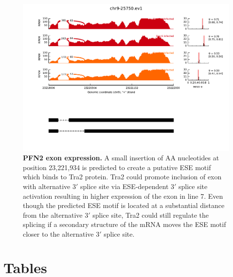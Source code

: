 \documentclass[10pt]{article}
\begin{document}
\begin{figure}[!ht]
    \begin{center}
        \includegraphics[width=6in]{pfn2_miso.pdf}
    \end{center}
    \caption{
        {\bf PFN2 exon expression.}
        A small insertion of AA nucleotides at position 23,221,934 is predicted to create a putative ESE motif
        which binds to Tra2 protein.
        Tra2 could promote inclusion of exon with alternative 3$\prime$ splice site via ESE-dependent
        3$\prime$ splice site activation resulting in higher expression of the exon in line 7.
        Even though the predicted ESE motif is located at a substantial distance from the alternative 3$\prime$ splice site,
        Tra2 could still regulate the splicing if a secondary structure of the mRNA moves the ESE motif closer to the
        alternative 3$\prime$ splice site.
    }
    \label{pfn2}
\end{figure}

\section*{Tables}

\end{document}
